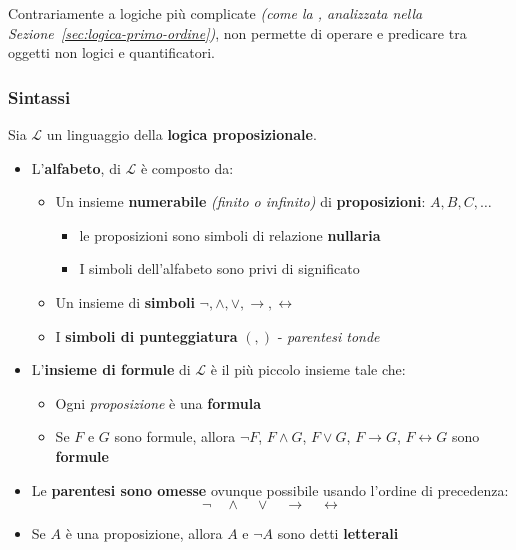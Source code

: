 \documentclass[italian, 10pt]{article}
\begin{document}
Contrariamente a logiche più complicate \textit{(come la , analizzata nella Sezione~\ref{sec:logica-primo-ordine})}, non permette di operare e predicare tra oggetti non logici e quantificatori.

\subsubsection{Sintassi}

Sia \(\mathcal{L}\) un linguaggio della \textbf{logica proposizionale}.

\begin{itemize}
  \item L'\textbf{alfabeto}, di \(\mathcal{L}\) è composto da:
        \begin{itemize}
          \item Un insieme \textbf{numerabile} \textit{(finito o infinito)} di \textbf{proposizioni}: \(A, B, C, \ldots\)
                \begin{itemize}
                  \item le proposizioni sono simboli di relazione \textbf{nullaria}
                  \item I simboli dell'alfabeto sono privi di significato
                \end{itemize}
          \item Un insieme di \textbf{simboli} \textbf{} \(\lnot, \land, \lor, \rightarrow, \leftrightarrow\)
          \item I \textbf{simboli di punteggiatura} \(  (, ) \) - \textit{parentesi tonde}
        \end{itemize}
  \item L'\textbf{insieme di formule} di \(\mathcal{L}\) è il più piccolo insieme tale che:
        \begin{itemize}
          \item Ogni \textit{proposizione} è una \textbf{formula}
          \item Se \(F\) e \(G\) sono formule, allora \(\lnot F\), \(F \land G\), \(F \lor G\), \(F \rightarrow G\),  \(F \leftrightarrow G\) sono \textbf{formule}
        \end{itemize}
  \item Le \textbf{parentesi sono omesse} ovunque possibile usando l'ordine di precedenza:
        \[ \lnot \quad \land \quad \lor \quad \rightarrow \quad \leftrightarrow \]
  \item Se \(A\) è una proposizione, allora \(A\) e \(\lnot A\) sono detti \textbf{letterali}

\end{itemize}
\end{document}
